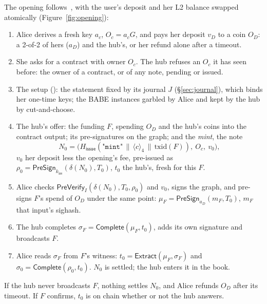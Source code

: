 \documentclass[11pt]{article}
\theoremstyle{plain}
\theoremstyle{definition}
\newcommand{\be}[2]{\langle #1\rangle_{#2}}
\newcommand{\Ht}[1]{H_{\textsf{#1}}}
\newcommand{\PSign}{\mathsf{PreSign}}
\newcommand{\PVfy}{\mathsf{PreVerify}}
\newcommand{\Compl}{\mathsf{Complete}}
\newcommand{\Extr}{\mathsf{Extract}}
\newcommand{\kiss}{k_{\mathrm{iss}}}
\newcommand{\Oc}{O_c}
\begin{document}
The opening follows~\cite{lichen}, with the user's deposit and her L2
balance swapped atomically (Figure~\ref{fig:opening}):
\begin{enumerate}[nosep]
\item Alice derives a fresh key $a_c$, $\Oc = a_cG$, and pays her
  deposit $v_D$ to a coin $O_D$: a 2-of-2 of hers ($a_D$) and the
  hub's, or her refund alone after a timeout.
\item She asks for a contract with owner $\Oc$. The hub refuses an $\Oc$
  it has seen before: the owner of a contract, or of any note, pending
  or issued.
\item The setup (\cite{lichen}): the statement fixed by its journal $J$
  (\S\ref{sec:journal}), which binds her one-time keys; the BABE
  instances garbled by Alice and kept by the hub by cut-and-choose.
\item The hub's offer: the funding $F$, spending $O_D$ and the hub's
  coins into the contract output; its pre-signatures on the graph; and
  the \emph{mint}, the note
  \[
    N_0 = \big(\Ht{issue}(\texttt{"mint"} \,\|\, \be{c}{4} \,\|\,
    \mathrm{txid}(F)),\ \Oc,\ v_0\big),
  \]
  $v_0$ her deposit less the opening's fee, pre-issued as $\rho_0 =
  \PSign_{\kiss}(\delta(N_0), T_0)$, $t_0$ the hub's, fresh for this $F$.
\item Alice checks $\PVfy_I(\delta(N_0), T_0, \rho_0)$ and $v_0$, signs
  the graph, and pre-signs $F$'s spend of $O_D$ under the same point:
  $\mu_F = \PSign_{a_D}(m_F, T_0)$, $m_F$ that input's sighash.
\item The hub completes $\sigma_F = \Compl(\mu_F, t_0)$, adds its own
  signature and broadcasts $F$.
\item Alice reads $\sigma_F$ from $F$'s witness: $t_0 = \Extr(\mu_F,
  \sigma_F)$ and $\sigma_0 = \Compl(\rho_0, t_0)$. $N_0$ is settled; the
  hub enters it in the book.
\end{enumerate}
If the hub never broadcasts $F$, nothing settles $N_0$, and Alice
refunds $O_D$ after its timeout. If $F$ confirms, $t_0$ is on chain
whether or not the hub answers.
\end{document}
